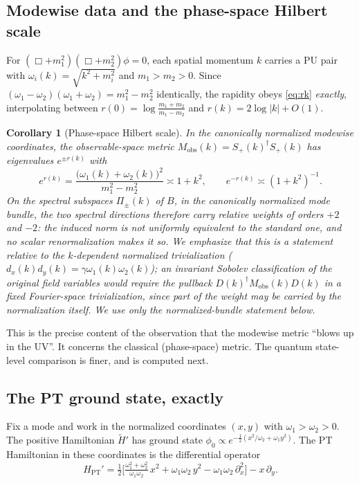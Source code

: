 \documentclass[11pt]{article}
\newtheorem{corollary}[theorem]{Corollary}
\theoremstyle{definition}
\theoremstyle{remark}
\newcommand{\w}{\omega}
\newcommand{\dg}{\dagger}
\begin{document}
\subsection{Modewise data and the phase-space Hilbert scale}

For $(\Box+m_1^2)(\Box+m_2^2)\phi=0$, each spatial momentum $k$ carries a PU
pair with $\w_i(k)=\sqrt{k^2+m_i^2}$ and $m_1>m_2>0$.  Since
$(\w_1-\w_2)(\w_1+\w_2)=m_1^2-m_2^2$ identically, the rapidity obeys
\eqref{eq:rk} \emph{exactly}, interpolating between
$r(0)=\log\frac{m_1+m_2}{m_1-m_2}$ and $r(k)=2\log|k|+O(1)$.

\begin{corollary}[Phase-space Hilbert scale]\label{cor:scale}
In the canonically normalized modewise coordinates, the observable-space
metric $M_{\mathrm{obs}}(k)=S_+(k)^{\dg}S_+(k)$ has eigenvalues
$e^{\pm r(k)}$ with
\begin{equation}
e^{r(k)}=\frac{\big(\w_1(k)+\w_2(k)\big)^2}{m_1^2-m_2^2}
\asymp 1+k^2 ,
\qquad
e^{-r(k)}\asymp(1+k^2)^{-1} .
\end{equation}
On the spectral subspaces $\Pi_\pm(k)$ of $B$, \emph{in the canonically
normalized mode bundle}, the two spectral directions therefore carry
relative weights of orders $+2$ and $-2$: the induced norm is not
uniformly equivalent to the standard one, and no scalar renormalization
makes it so.  We emphasize that this is a statement relative to the
$k$-dependent normalized trivialization
($d_x(k)d_y(k)=\gamma\w_1(k)\w_2(k)$); an invariant Sobolev
classification of the \emph{original} field variables would require the
pullback $D(k)^{\dg}M_{\mathrm{obs}}(k)D(k)$ in a fixed Fourier-space
trivialization, since part of the weight may be carried by the
normalization itself.  We use only the normalized-bundle statement below.
\end{corollary}

This is the precise content of the observation that the modewise metric
``blows up in the UV''.  It concerns the classical (phase-space) metric.
The quantum state-level comparison is finer, and is computed next.

\subsection{The PT ground state, exactly}

Fix a mode and work in the normalized coordinates $(x,y)$ with
$\w_1>\w_2>0$.  The positive Hamiltonian $\widetilde H'$ has ground state
$\phi_0\propto e^{-\frac12(x^2/\w_2+\w_1y^2)}$.  The PT Hamiltonian in these
coordinates is the differential operator
\begin{equation}
H_{\mathrm{PT}}'=\tfrac12\Big[\tfrac{\w_1^2+\w_2^2}{\w_1\w_2}\,x^2
+\w_1\w_2\,y^2-\w_1\w_2\,\partial_x^2\Big]-x\,\partial_y .
\end{equation}
\end{document}
